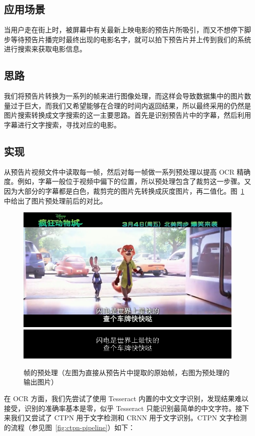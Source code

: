 \documentclass[main.tex]{subfiles}
\begin{document}
\subsection{应用场景}

当用户走在街上时，被屏幕中有关最新上映电影的预告片所吸引，而又不想停下脚步等待预告片播完时最终出现的电影名字，就可以拍下预告片并上传到我们的系统进行搜索来获取电影信息。

\subsection{思路}

我们将预告片转换为一系列的帧来进行图像处理，而这样会导致数据集中的图片数量过于巨大，而我们又希望能够在合理的时间内返回结果，所以最终采用的仍然是图片搜索转换成文字搜索的这一主要思路。首先是识别预告片中的字幕，然后利用字幕进行文字搜索，寻找对应的电影。

\subsection{实现}

从预告片视频文件中读取每一帧，然后对每一帧做一系列预处理以提高 OCR 精确度。例如，字幕一般位于视频中偏下的位置，所以预处理包含了裁剪这一步骤。又因为大部分的字幕都是白色，裁剪完的图片先转换成灰度图片，再二值化。图~\ref{fig:frame-preprocessing} 中给出了图片预处理前后的对比。

\begin{figure}[h]
    \includegraphics[width=0.5\linewidth]{images/frame_before_preprocessing.png}
    \includegraphics[width=0.5\linewidth]{images/frame_after_preprocessing.png}
    \caption{帧的预处理（左图为直接从预告片中提取的原始帧，右图为预处理的输出图片）}    \label{fig:frame-preprocessing}
\end{figure}

在 OCR 方面，我们先尝试了使用 Tesseract 内置的中文文字识别，发现结果难以接受，识别的准确率基本是零，似乎 Tesseract 只能识别最简单的中文字符。接下来我们又尝试了 CTPN \cite{tian2016detecting} 用于文字检测和 CRNN 用于文字识别。CTPN 文字检测的流程（参见图~\ref{fig:ctpn-pipeline}）如下：
\end{document}
